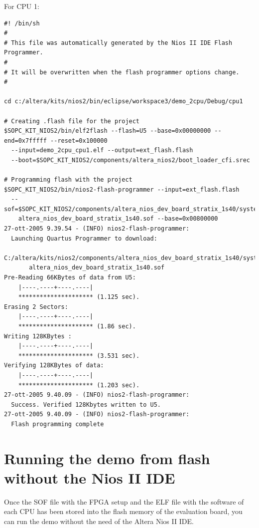 For CPU 1:


\begin{lstlisting}[basicstyle=\scriptsize\ttfamily]
#! /bin/sh
#
# This file was automatically generated by the Nios II IDE Flash Programmer.
#
# It will be overwritten when the flash programmer options change.
#

cd c:/altera/kits/nios2/bin/eclipse/workspace3/demo_2cpu/Debug/cpu1

# Creating .flash file for the project
$SOPC_KIT_NIOS2/bin/elf2flash --flash=U5 --base=0x00000000 --end=0x7fffff --reset=0x100000 
  --input=demo_2cpu_cpu1.elf --output=ext_flash.flash 
  --boot=$SOPC_KIT_NIOS2/components/altera_nios2/boot_loader_cfi.srec

# Programming flash with the project
$SOPC_KIT_NIOS2/bin/nios2-flash-programmer --input=ext_flash.flash 
  --sof=$SOPC_KIT_NIOS2/components/altera_nios_dev_board_stratix_1s40/system/
    altera_nios_dev_board_stratix_1s40.sof --base=0x00800000
27-ott-2005 9.39.54 - (INFO) nios2-flash-programmer: 
  Launching Quartus Programmer to download:
     C:/altera/kits/nios2/components/altera_nios_dev_board_stratix_1s40/system/
       altera_nios_dev_board_stratix_1s40.sof
Pre-Reading 66KBytes of data from U5:
    |----.----+----.----|
    ********************* (1.125 sec).
Erasing 2 Sectors:
    |----.----+----.----|
    ********************* (1.86 sec).
Writing 128KBytes :
    |----.----+----.----|
    ********************* (3.531 sec).
Verifying 128KBytes of data:
    |----.----+----.----|
    ********************* (1.203 sec).
27-ott-2005 9.40.09 - (INFO) nios2-flash-programmer: 
  Success. Verified 128Kbytes written to U5.
27-ott-2005 9.40.09 - (INFO) nios2-flash-programmer: 
  Flash programming complete
\end{lstlisting}

\section{Running the demo from flash without the Nios II IDE}

Once the SOF file with the FPGA setup and the ELF file with the
software of each CPU has been stored into the flash memory of the
evaluation board, you can run the demo without the need of the Altera
Nios II IDE.

